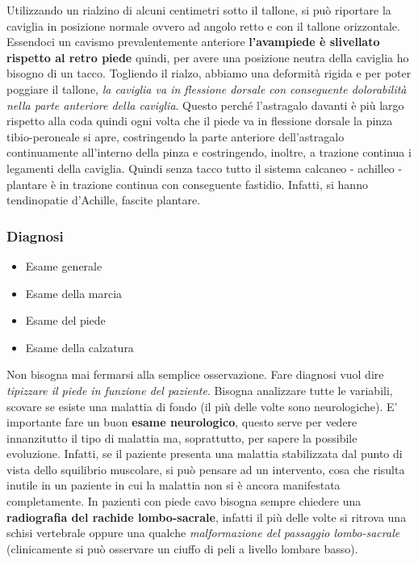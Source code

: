 Utilizzando un rialzino di alcuni centimetri sotto il tallone, si può riportare la caviglia in posizione normale ovvero ad angolo retto e con il tallone orizzontale. Essendoci un cavismo prevalentemente anteriore \textbf{l'avampiede è slivellato rispetto al retro piede} quindi, per avere una posizione neutra della caviglia ho bisogno di un tacco.
Togliendo il rialzo, abbiamo una deformità rigida e per poter poggiare il tallone, \emph{la caviglia va in flessione dorsale con conseguente
dolorabilità nella parte anteriore della caviglia}. Questo perché
l'astragalo davanti è più largo rispetto alla coda quindi ogni volta che il piede va in flessione dorsale la pinza tibio-peroneale si apre, costringendo la parte anteriore dell'astragalo continuamente all'interno della pinza e costringendo, inoltre, a trazione continua i legamenti
della caviglia. Quindi senza tacco tutto il sistema calcaneo - achilleo - plantare è in trazione continua con conseguente fastidio. Infatti, si hanno tendinopatie d'Achille, fascite plantare.

\subsubsection{Diagnosi}

\begin{itemize}
\item
  Esame generale
\item
  Esame della marcia
\item
  Esame del piede
\item
  Esame della calzatura
\end{itemize}

Non bisogna mai fermarsi alla semplice osservazione. Fare diagnosi vuol dire \emph{\emph{tipizzare il piede in funzione del paziente}}. Bisogna analizzare tutte le variabili, scovare se esiste una malattia di fondo
(il più delle volte sono neurologiche). E' importante fare un buon \textbf{esame neurologico}, questo serve per vedere innanzitutto il tipo di malattia ma, soprattutto, per sapere la possibile evoluzione.
Infatti, se il paziente presenta una malattia stabilizzata dal punto di vista dello squilibrio muscolare, si può pensare ad un intervento, cosa che risulta inutile in un paziente in cui la malattia non si è ancora manifestata completamente. In pazienti con piede cavo bisogna sempre
chiedere una \textbf{radiografia del rachide lombo-sacrale}, infatti il più delle volte si ritrova una schisi vertebrale oppure una qualche \emph{malformazione del passaggio lombo-sacrale} (clinicamente si può
osservare un ciuffo di peli a livello lombare basso).


